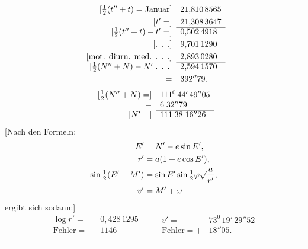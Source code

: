 \clearpage
\begingroup
{}
\begin{center}\end{center}
\noindent{\small [S. 3 u. 11]}
\[
\begin{array}{rl}
{}[\frac12(t''+t)=\text{Januar}]&21{,}810\,8565\\[3pt]
{}[t'=]&21{,}308\,3647\\\cline{2-2}
{}[\frac12(t''+t)-t'=]&0{,}502\,4918\\[3pt]
{}[\text{. . .}]&9{,}701\,1290\\[3pt]
{}[\text{mot. diurn. med. . . .}]&2{,}893\,0280\\\cline{2-2}
{}[\frac12(N''+N)-N'\;\text{. . .}]&2{,}594\,1570\\[3pt]
=&392''79.
\end{array}
\]
\[
\begin{array}{rl}
{}[\frac12(N''+N)=]&111^0\,44'\,49''05\\
-&6\;32''79\\\cline{2-2}
{}[N'=]&111\;38\;16''26
\end{array}
\]
\noindent\hspace*{\parindent}[Nach den Formeln:
\[
\begin{aligned}
E'&=N'-e\sin E',\\
r'&=a(1+e\cos E'),\\
\sin\tfrac12(E'-M')&=\sin E'\sin\tfrac12\varphi\surd\frac a{r'},\\
v'&=M'+\omega
\end{aligned}
\]
\clearpage
{}
\noindent ergibt sich sodann:]
\[
\begin{array}{rl}
\log r'=&0{,}428\,1295\\
\text{Fehler}=-&1146
\end{array}
\qquad
\begin{array}{rl}
v'=&73^0\,19'\,29''52\\
\text{Fehler}=+&18''05.
\end{array}
\]
\noindent\rule{\linewidth}{.3pt}
\clearpage
\endgroup

